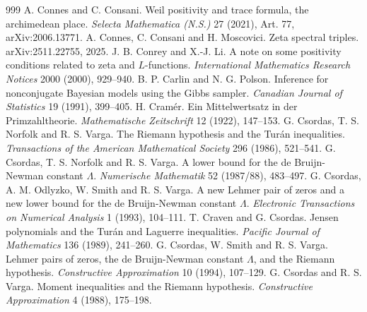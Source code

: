 \begin{thebibliography}{999}
 A. Connes and C. Consani. Weil positivity and trace formula, the archimedean place. \emph{Selecta Mathematica (N.S.)} 27 (2021), Art. 77, arXiv:2006.13771.
 A. Connes, C. Consani and H. Moscovici. Zeta spectral triples. arXiv:2511.22755, 2025.
 J. B. Conrey and X.-J. Li. A note on some positivity conditions related to zeta and $L$-functions. \emph{International Mathematics Research Notices} 2000 (2000), 929--940.
 B. P. Carlin and N. G. Polson. Inference for nonconjugate Bayesian models using the Gibbs sampler. \emph{Canadian Journal of Statistics} 19 (1991), 399--405.
 H. Cram\'er. Ein Mittelwertsatz in der Primzahltheorie. \emph{Mathematische Zeitschrift} 12 (1922), 147--153.
 G. Csordas, T. S. Norfolk and R. S. Varga. The Riemann hypothesis and the Tur\'an inequalities. \emph{Transactions of the American Mathematical Society} 296 (1986), 521--541.
 G. Csordas, T. S. Norfolk and R. S. Varga. A lower bound for the de Bruijn-Newman constant $\Lambda$. \emph{Numerische Mathematik} 52 (1987/88), 483--497. %
 G. Csordas, A. M. Odlyzko, W. Smith and R. S. Varga. A new Lehmer pair of zeros and a new lower bound for the de Bruijn-Newman constant $\Lambda$. \emph{Electronic Transactions on Numerical Analysis} 1 (1993), 104--111.
 T. Craven and G. Csordas. Jensen polynomials and the Tur\'an and Laguerre inequalities. \emph{Pacific Journal of Mathematics} 136 (1989), 241--260. %
 G. Csordas, W. Smith and R. S. Varga. Lehmer pairs of zeros, the de Bruijn-Newman constant $\Lambda$, and the Riemann hypothesis. \emph{Constructive Approximation} 10 (1994), 107--129.
 G. Csordas and R. S. Varga. Moment inequalities and the Riemann hypothesis. \emph{Constructive Approximation} 4 (1988), 175--198. %

\end{thebibliography}
